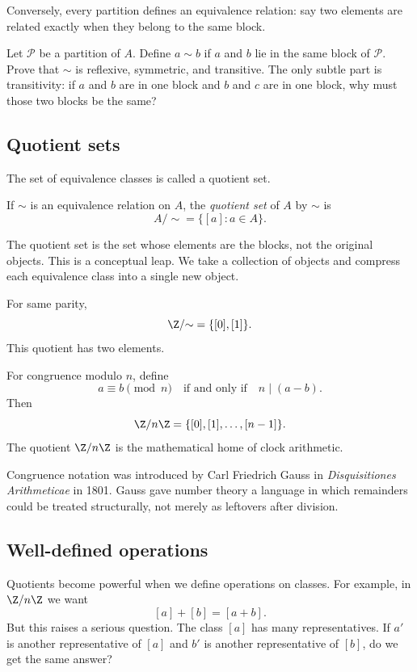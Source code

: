 Conversely, every partition defines an equivalence relation: say two elements are related exactly when they belong to the same block.

\begin{labbox}
Let $\mathcal{P}$ be a partition of $A$. Define $a\sim b$ if $a$ and $b$ lie in the same block of $\mathcal{P}$. Prove that $\sim$ is reflexive, symmetric, and transitive. The only subtle part is transitivity: if $a$ and $b$ are in one block and $b$ and $c$ are in one block, why must those two blocks be the same?
\end{labbox}

\subsection{Quotient sets}

The set of equivalence classes is called a quotient set.

\begin{definition}
If $\sim$ is an equivalence relation on $A$, the \emph{quotient set} of $A$ by $\sim$ is
\[
A/{\sim}=\{[a]:a\in A\}.
\]
\end{definition}

The quotient set is the set whose elements are the blocks, not the original objects. This is a conceptual leap. We take a collection of objects and compress each equivalence class into a single new object.

For same parity,
\[
\Z/{\sim}=\{[0],[1]\}.
\]
This quotient has two elements.

For congruence modulo $n$, define
\[
a\equiv b\pmod n\quad\text{if and only if}\quad n\mid(a-b).
\]
Then
\[
\Z/n\Z=\{[0],[1],\ldots,[n-1]\}.
\]
The quotient $\Z/n\Z$ is the mathematical home of clock arithmetic.

\begin{historybox}
Congruence notation was introduced by Carl Friedrich Gauss in \emph{Disquisitiones Arithmeticae} in 1801. Gauss gave number theory a language in which remainders could be treated structurally, not merely as leftovers after division.
\end{historybox}

\subsection{Well-defined operations}

Quotients become powerful when we define operations on classes. For example, in $\Z/n\Z$ we want
\[
[a]+[b]=[a+b].
\]
But this raises a serious question. The class $[a]$ has many representatives. If $a'$ is another representative of $[a]$ and $b'$ is another representative of $[b]$, do we get the same answer?

